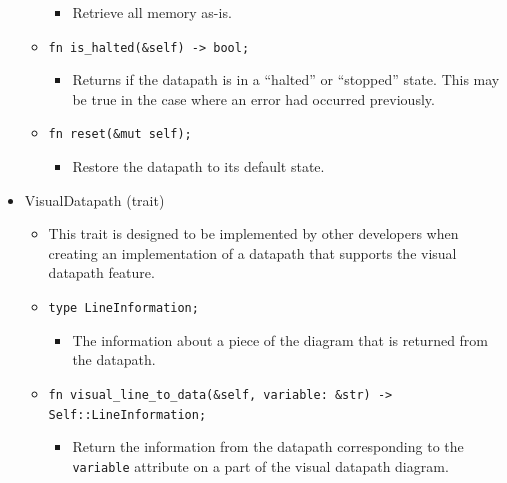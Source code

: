 \documentclass[
    paper=letter,
    parskip=half,
    fontsize=12pt,
    titlepage=firstiscover,
    toc=bibliography,
    numbers=endperiod
]{scrartcl}
\providecommand{\tightlist}{%
  \setlength{\itemsep}{0pt}\setlength{\parskip}{0pt}}
\begin{document}
\begin{itemize}
\begin{itemize}
                    \begin{itemize}
                        \tightlist
                        \item Retrieve all memory as-is.
                    \end{itemize}
              \item \texttt{fn is\_halted(\&self) -\textgreater{} bool;}
                    \begin{itemize}
                        \tightlist
                        \item Returns if the datapath is in a ``halted'' or ``stopped'' state. This
                              may be true in the case where an error had occurred previously.
                    \end{itemize}
              \item \texttt{fn reset(\&mut self);}
                    \begin{itemize}
                        \tightlist
                        \item Restore the datapath to its default state.
                    \end{itemize}
          \end{itemize}

    \item VisualDatapath (trait)
          \begin{itemize}
              \tightlist
              \item This trait is designed to be implemented by other developers when
                    creating an implementation of a datapath that supports the visual
                    datapath feature.
              \item \texttt{type LineInformation;}
                    \begin{itemize}
                        \tightlist
                        \item The information about a piece of the diagram that is returned from the
                              datapath.
                    \end{itemize}
              \item \texttt{fn visual\_line\_to\_data(\&self, variable: \&str) -\textgreater{} Self::LineInformation;}
                    \begin{itemize}
                        \tightlist
                        \item Return the information from the datapath corresponding to the
                              \texttt{variable} attribute on a part of the visual datapath diagram.
                    \end{itemize}
          \end{itemize}


\end{itemize}
\end{document}

